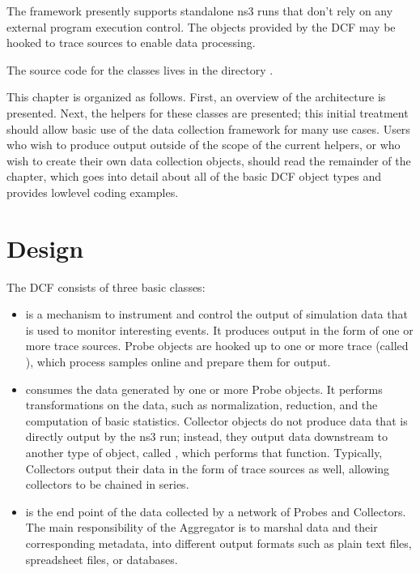 \documentclass[letterpaper,10pt,english]{sphinxmanual}
\renewcommand{\sphinxcode}[1]{\texttt{\small{#1}}}
\begin{document}
The framework presently supports standalone ns\sphinxhyphen{}3 runs that don’t rely on
any external program execution control.  The objects provided by the
DCF may be hooked to  trace sources to enable data processing.

The source code for the classes lives in the directory \sphinxcode{}.

This chapter is organized as follows.  First, an overview of the architecture
is presented.  Next, the helpers for these classes are presented; this
initial treatment should allow basic use of the data collection framework
for many use cases.  Users who wish to produce output outside of the
scope of the current helpers, or who wish to create their own data
collection objects, should read the remainder of the chapter, which
goes into detail about all of the basic DCF object types and provides
low\sphinxhyphen{}level coding examples.


\section{Design}
\label{\detokenize{data-collection-overview:design}}\label{\detokenize{data-collection-overview::doc}}
The DCF consists of three basic classes:
\begin{itemize}
\item {} 
 is a mechanism to instrument and control the output of
simulation data that is used to monitor interesting events. It
produces output in the form of one or more  trace sources.
Probe objects are hooked up to one or more trace  (called
), which process samples on\sphinxhyphen{}line and prepare them for
output.

\item {} 
 consumes the data generated by one or more Probe objects.
It performs transformations on the data, such as normalization, reduction, and
the computation of basic statistics. Collector objects do not produce
data that is directly output by the ns\sphinxhyphen{}3 run; instead, they output data
downstream to another type of object, called , which performs
that function.  Typically, Collectors output their data in the form of
trace sources as well, allowing collectors to be chained in series.

\item {} 
 is the end point of the data collected by a network of Probes and Collectors.
The main responsibility of the Aggregator is to marshal data and their
corresponding metadata, into different output
formats such as plain text files, spreadsheet files, or databases.

\end{itemize}
\end{document}
